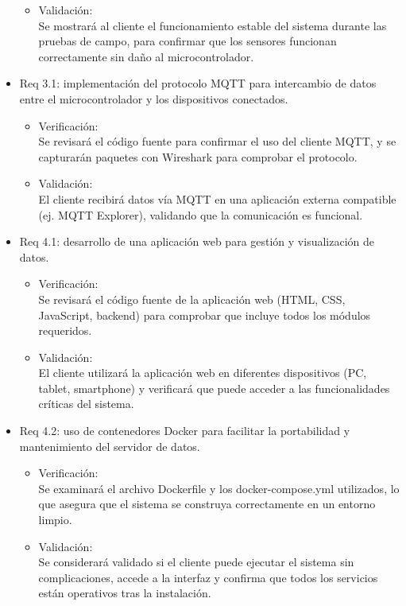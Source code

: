 \documentclass[
11pt, %
]{charter}
\begin{document}
\begin{itemize}
\begin{itemize}
	\item Validación: \\ Se mostrará al cliente el funcionamiento estable del sistema durante las pruebas de campo, para confirmar que los sensores funcionan correctamente sin daño al microcontrolador.
\end{itemize}

\item Req 3.1: implementación del protocolo MQTT para intercambio de datos entre el microcontrolador y los dispositivos conectados.

\begin{itemize}
	\item Verificación: \\ Se revisará el código fuente para confirmar el uso del cliente MQTT, y se capturarán paquetes con Wireshark para comprobar el protocolo.
	
	\item Validación: \\ El cliente recibirá datos vía MQTT en una aplicación externa compatible (ej. MQTT Explorer), validando que la comunicación es funcional.
\end{itemize}

\item Req 4.1: desarrollo de una aplicación web para gestión y visualización de datos.
\begin{itemize}
	\item Verificación: \\ Se revisará el código fuente de la aplicación web (HTML, CSS, JavaScript, backend) para comprobar que incluye todos los módulos requeridos.
	
	\item Validación: \\ El cliente utilizará la aplicación web en diferentes dispositivos (PC, tablet, smartphone) y verificará que puede acceder a las funcionalidades críticas del sistema.
	\end{itemize}
	
\item Req 4.2: uso de contenedores Docker para facilitar la portabilidad y mantenimiento del servidor de datos.
\begin{itemize}
	\item Verificación: \\ Se examinará el archivo Dockerfile y los docker-compose.yml utilizados, lo que asegura que el sistema se construya correctamente en un entorno limpio. 

	\item Validación: \\ Se considerará validado si el cliente puede ejecutar el sistema sin complicaciones, accede a la interfaz y confirma que todos los servicios están operativos tras la instalación.
\end{itemize}

\end{itemize}
\end{document}
